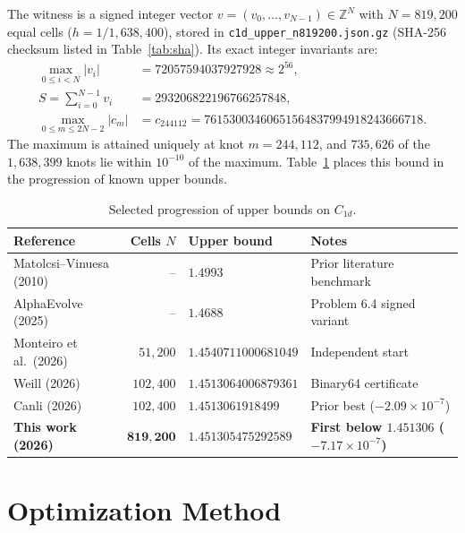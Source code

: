 \documentclass[11pt]{article}
\begin{document}
The witness is a signed integer vector $v = (v_0, \dots, v_{N-1}) \in \mathbb{Z}^N$ with $N = 819{,}200$ equal cells ($h = 1/1{,}638{,}400$), stored in \texttt{c1d\_upper\_n819200.json.gz} (SHA-256 checksum listed in Table~\ref{tab:sha}). Its exact integer invariants are:
\begin{align*}
  \max_{0 \le i < N} |v_i| &= 72057594037927928 \approx 2^{56}, \\
  S = \sum_{i=0}^{N-1} v_i &= 293206822196766257848, \\
  \max_{0 \le m \le 2N-2} |c_m| &= c_{244112} = 76153003460651564837994918243666718.
\end{align*}
The maximum is attained uniquely at knot $m = 244{,}112$, and $735{,}626$ of the $1{,}638{,}399$ knots lie within $10^{-10}$ of the maximum. Table~\ref{tab:history} places this bound in the progression of known upper bounds.

\begin{table}[h]
\centering
\caption{Selected progression of upper bounds on $C_{1d}$.}
\label{tab:history}
\small
\begin{tabular}{@{}lrll@{}}
\toprule
Reference & Cells $N$ & Upper bound & Notes \\
\midrule
Matolcsi--Vinuesa (2010) \cite{MV2010} & -- & $1.4993$ & Prior literature benchmark \\
AlphaEvolve (2025) \cite{GGSWT2025} & -- & $1.4688$ & Problem 6.4 signed variant \\
Monteiro et al.\ (2026) \cite{REV2026} & $51{,}200$ & $1.4540711000681049$ & Independent start \\
Weill (2026) \cite{WEILL2026} & $102{,}400$ & $1.4513064006879361$ & Binary64 certificate \\
Canli (2026) \cite{Can2026b} & $102{,}400$ & $1.4513061918499$ & Prior best ($-2.09 \times 10^{-7}$) \\
\textbf{This work (2026)} & $\mathbf{819{,}200}$ & $\mathbf{1.451305475292589}$ & \textbf{First below $1.451306$ ($-7.17 \times 10^{-7}$)} \\
\bottomrule
\end{tabular}
\end{table}

\section{Optimization Method}
\end{document}
